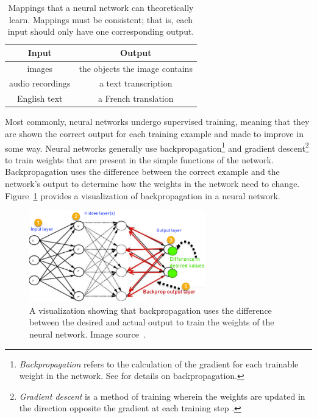 \documentclass{article}
\begin{document}
\begin{table}
    \centering
    \begin{tabular}{|c|c|}
        \hline
        \textbf{Input} & \textbf{Output} \\
        \hline
        images & the objects the image contains \\
        \hline
        audio recordings & a text transcription \\
        \hline
        English text & a French translation \\
        \hline
    \end{tabular}
    \caption{Mappings that a neural network can theoretically learn. Mappings must be consistent; that is, each input should only have one corresponding output.}\label{table:mappings}
\end{table}

Most commonly, neural networks undergo supervised training, meaning that they are shown the correct output for each training example and made to improve in some way. Neural networks generally use backpropagation\footnote{\textit{Backpropagation} refers to the calculation of the gradient for each trainable weight in the network. See \cite{backprop_theory} for details on backpropagation.} and gradient descent\footnote{\textit{Gradient descent} is a method of training wherein the weights are updated in the direction opposite the gradient at each training step \cite{gradient_descent}.} to train weights that are present in the simple functions of the network. Backpropagation uses the difference between the correct example and the network's output to determine how the weights in the network need to change. Figure~\ref{figure:backpropagation} provides a visualization of backpropagation in a neural network.

\begin{figure}
    \centering
    \includegraphics[width=3in]{figures/backpropagation.png}
    \caption{A visualization showing that backpropagation uses the difference between the desired and actual output to train the weights of the neural network. Image source~\protect\cite{backprop}.}\label{figure:backpropagation}
\end{figure}
\end{document}
